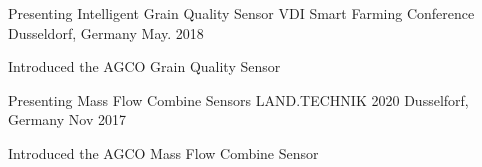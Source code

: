 

\begin{cventries}

  \cventry
    {Presenting Intelligent Grain Quality Sensor} %
    {VDI Smart Farming Conference} %
    {Dusseldorf, Germany} %
    {May. 2018} %
    {
      \begin{cvitems} %
        \item {Introduced the AGCO Grain Quality Sensor}
      \end{cvitems}
    }

  \cventry
    {Presenting Mass Flow Combine Sensors} %
    {LAND.TECHNIK 2020} %
    {Dusselforf, Germany} %
    {Nov 2017} %
    {
      \begin{cvitems} %
        \item {Introduced the AGCO Mass Flow Combine Sensor}
      \end{cvitems}
    }

\end{cventries}
